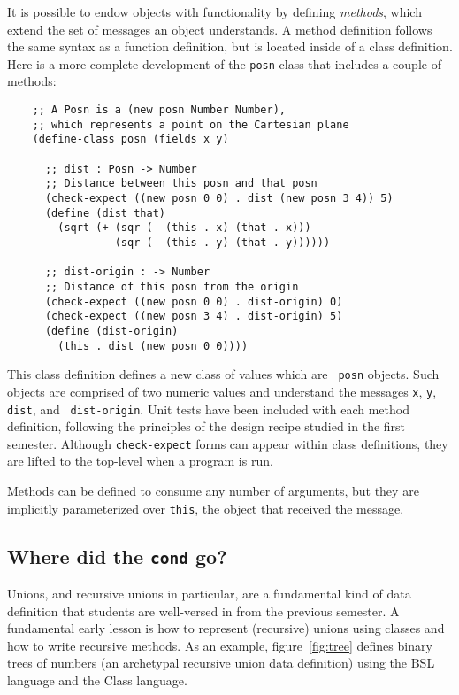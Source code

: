 \documentclass[submission,copyright]{eptcs}
\begin{document}
It is possible to endow objects with functionality by defining \emph{methods},
which extend the set of messages an object understands.  A method definition
follows the same syntax as a function definition, but is located inside of a
class definition.  Here is a more complete development of the {\tt posn} class
that includes a couple of methods:
\begin{verbatim}
    ;; A Posn is a (new posn Number Number),
    ;; which represents a point on the Cartesian plane
    (define-class posn (fields x y)

      ;; dist : Posn -> Number
      ;; Distance between this posn and that posn
      (check-expect ((new posn 0 0) . dist (new posn 3 4)) 5)
      (define (dist that)
        (sqrt (+ (sqr (- (this . x) (that . x)))
                 (sqr (- (this . y) (that . y))))))

      ;; dist-origin : -> Number
      ;; Distance of this posn from the origin
      (check-expect ((new posn 0 0) . dist-origin) 0)
      (check-expect ((new posn 3 4) . dist-origin) 5)
      (define (dist-origin)
        (this . dist (new posn 0 0))))
\end{verbatim}

This class definition defines a new class of values which are {\tt
  posn} objects.  Such objects are comprised of two numeric values and
understand the messages {\tt x}, {\tt y}, {\tt dist}, and {\tt
  dist-origin}.  Unit tests have been included with each method
definition, following the principles of the design recipe studied in
the first semester.  Although {\tt check-expect} forms can appear
within class definitions, they are lifted to the top-level when a
program is run.

Methods can be defined to consume any number of arguments, but they
are implicitly parameterized over {\tt this}, the object that received
the message.

\subsection{Where did the {\tt cond} go?}

Unions, and recursive unions in particular, are a fundamental kind of
data definition that students are well-versed in from the previous
semester.  A fundamental early lesson is how to represent (recursive)
unions using classes and how to write recursive methods.  As an
example, figure~\ref{fig:tree} defines binary trees of numbers
(an archetypal recursive union data definition)
using the BSL language and the Class language.
\end{document}
